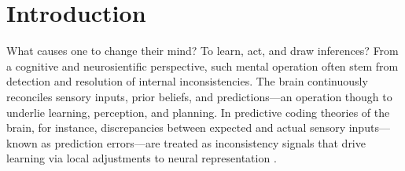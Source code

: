 \documentclass{article} %
\theoremstyle{plain}
\theoremstyle{definition}
\theoremstyle{remark}
\begin{document}
\section{Introduction}

%
%
What causes one to change their mind? To learn, act, and draw inferences? 
From a cognitive and neurosientific perspective, such mental operation often stem from detection and resolution of internal inconsistencies. The brain continuously reconciles sensory inputs, prior beliefs, and predictions—an operation though to underlie learning, perception, and planning. In predictive coding theories of the brain, for instance, discrepancies between expected and actual sensory inputs—known as prediction errors—are treated as inconsistency signals that drive learning via local adjustments to neural representation .
\end{document}
